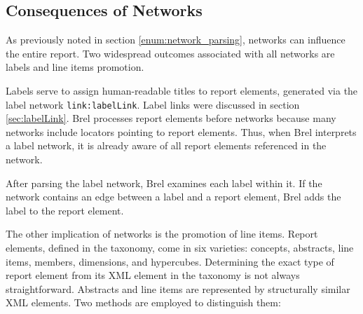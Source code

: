 


\subsection{Consequences of Networks}

As previously noted in section \ref{enum:network_parsing}, networks can influence the entire report.
Two widespread outcomes associated with all networks are labels and line items promotion.

Labels serve to assign human-readable titles to report elements, generated via the label network \texttt{link:labelLink}.
Label links were discussed in section \ref{sec:labelLink}.
Brel processes report elements before networks because many networks include locators pointing to report elements.
Thus, when Brel interprets a label network, it is already aware of all report elements referenced in the network.

After parsing the label network, Brel examines each label within it.
If the network contains an edge between a label and a report element, Brel adds the label to the report element.

The other implication of networks is the promotion of line items.
Report elements, defined in the taxonomy, come in six varieties: concepts, abstracts, line items, members, dimensions, and hypercubes.
Determining the exact type of report element from its XML element in the taxonomy is not always straightforward.
Abstracts and line items are represented by structurally similar XML elements.
Two methods are employed to distinguish them:

